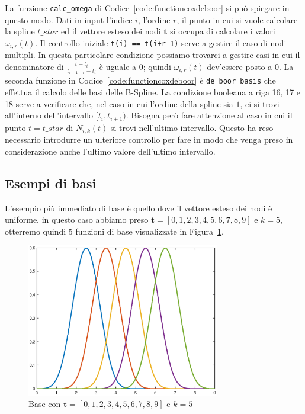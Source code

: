 \documentclass[a4paper, 12pt]{article}
\begin{document}

La funzione \texttt{calc\_omega} di Codice~\ref{code:functioncoxdeboor} si può spiegare in questo modo. Dati in input
l'indice $i$, l'ordine $r$, il punto in cui si vuole calcolare la spline $t\_star$ ed il vettore esteso dei nodi $\mathbf{t}$ si occupa di calcolare i valori $\omega_{i, r}(t)$.
Il controllo iniziale \texttt{t(i) == t(i+r-1)} serve a gestire il caso di nodi multipli. In questa particolare condizione possiamo trovarci a gestire casi in cui il denominatore di $\frac{t - t_i}{t_{i+1-r}-t_i}$ è uguale a $0$; quindi
$\omega_{i,r}(t)$ dev'essere posto a $0$. 
La seconda funzione in Codice~\ref{code:functioncoxdeboor} è \texttt{de\_boor\_basis} che effettua il calcolo delle basi delle B-Spline. 
La condizione booleana a riga 16, 17 e 18 serve a verificare che, nel caso 
in cui l'ordine della spline sia $1$, ci si trovi all'interno dell'intervallo $[t_i, t_{i+1} )$. Bisogna però fare attenzione al caso in cui 
il punto $t = t\_star$ di $N_{i, k}(t)$ si trovi nell'ultimo intervallo. Questo ha reso necessario introdurre un ulteriore controllo per fare in modo che venga 
preso in considerazione anche l'ultimo valore dell'ultimo intervallo.
\subsection{Esempi di basi}
L'esempio più immediato di base è quello dove il vettore esteso dei nodi è uniforme, in questo caso abbiamo preso $\mathbf{t} = [0, 1, 2, 3, 4, 5, 6, 7, 8, 9]$ e $k = 5$, otterremo quindi $5$
funzioni di base visualizzate in Figura~\ref{fig:first_basis}.
\begin{figure}[]
  \centering
  \includegraphics[width=0.75\textwidth]{figure/uniform_not_multiple_basis.eps}
  \caption{Base con $\mathbf{t} = [0, 1, 2, 3, 4, 5, 6, 7, 8, 9]$ e $k = 5$}
  \label{fig:first_basis}
\end{figure} 
\end{document}
